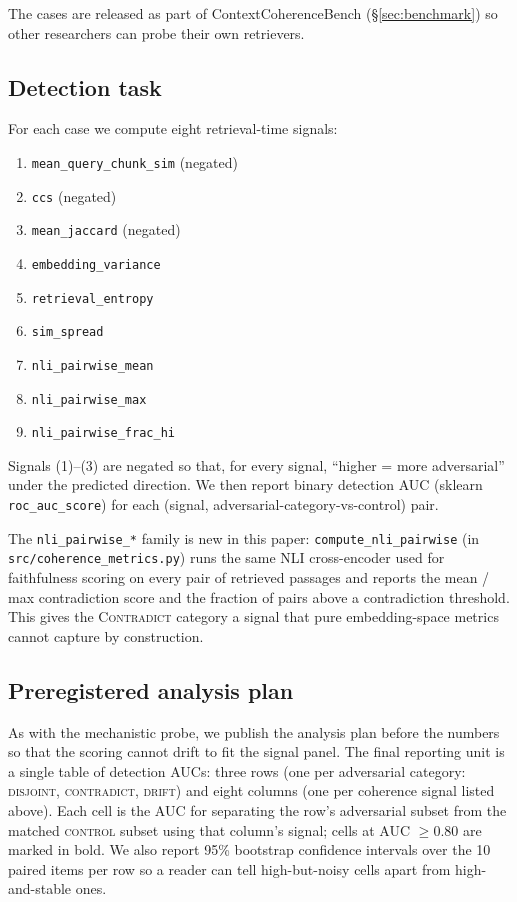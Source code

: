 The cases are released as part of ContextCoherenceBench
(§\ref{sec:benchmark}) so other researchers can probe their own
retrievers.

\subsection{Detection task}

For each case we compute eight retrieval-time signals:

\begin{enumerate}
  \item \texttt{mean\_query\_chunk\_sim} (negated)
  \item \texttt{ccs} (negated)
  \item \texttt{mean\_jaccard} (negated)
  \item \texttt{embedding\_variance}
  \item \texttt{retrieval\_entropy}
  \item \texttt{sim\_spread}
  \item \texttt{nli\_pairwise\_mean}
  \item \texttt{nli\_pairwise\_max}
  \item \texttt{nli\_pairwise\_frac\_hi}
\end{enumerate}

Signals (1)--(3) are negated so that, for every signal, ``higher = more
adversarial'' under the predicted direction. We then report binary
detection AUC (sklearn \texttt{roc\_auc\_score}) for each (signal,
adversarial-category-vs-control) pair.

The \texttt{nli\_pairwise\_*} family is new in this paper:
\texttt{compute\_nli\_pairwise} (in \texttt{src/coherence\_metrics.py})
runs the same NLI cross-encoder used for faithfulness scoring on every
pair of retrieved passages and reports the mean / max contradiction
score and the fraction of pairs above a contradiction threshold. This
gives the \textsc{Contradict} category a signal that pure embedding-space
metrics cannot capture by construction.

\subsection{Preregistered analysis plan}
\label{sec:adv_plan}

As with the mechanistic probe, we publish the analysis plan before the
numbers so that the scoring cannot drift to fit the signal panel. The
final reporting unit is a single table of detection AUCs: three rows
(one per adversarial category: \textsc{disjoint}, \textsc{contradict},
\textsc{drift}) and eight columns (one per coherence signal listed
above). Each cell is the AUC for separating the row's adversarial subset
from the matched \textsc{control} subset using that column's signal;
cells at AUC $\geq 0.80$ are marked in bold. We also report 95\%
bootstrap confidence intervals over the 10 paired items per row so a
reader can tell high-but-noisy cells apart from high-and-stable ones.

